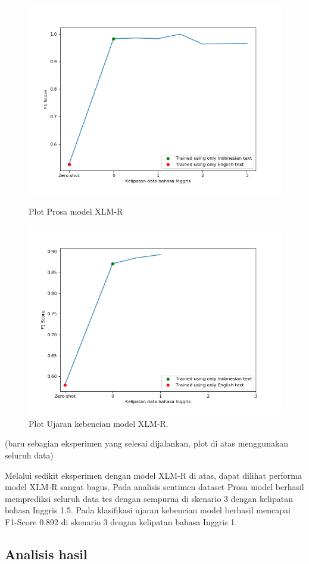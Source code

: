         \begin{figure}[ht]
              \includegraphics[width=\linewidth]{resources/plot-full-prosa-xlmr.png}
              \caption{Plot Prosa model XLM-R}\label{fig:plot_full_prosa_xlmr}
            \endminipage\hfill
              \includegraphics[width=\linewidth]{resources/plot-full-toxic-xlmr.png}
              \caption{Plot Ujaran kebencian model XLM-R.}\label{fig:plot_full_toxic_xlmr}
            \endminipage
        \end{figure}
        
        (baru sebagian eksperimen yang selesai dijalankan, plot di atas menggunakan seluruh data)
        
        Melalui sedikit eksperimen dengan model XLM-R di atas, dapat dilihat performa model XLM-R sangat bagus. Pada analisis sentimen dataset Prosa model berhasil memprediksi seluruh data tes dengan sempurna di skenario 3 dengan kelipatan bahasa Inggris 1.5. Pada klasifikasi ujaran kebencian model berhasil mencapai F1-Score 0.892 di skenario 3 dengan kelipatan bahasa Inggris 1.

    \subsection{Analisis hasil}
        
